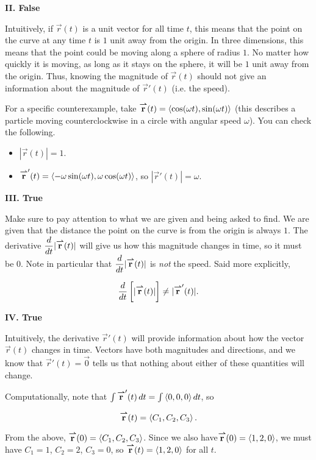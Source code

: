 \documentclass[noauthor]{ximera}
\begin{document}
\begin{problem}
\begin{freeResponse}
 \textbf{II. False} 
 
 \begin{explanation}
 Intuitively, if $\vec{r}(t)$ is a unit vector for all time $t$, this means that the point on the curve at any time $t$ is $1$ unit away from the origin.  In three dimensions, this means that the point could be moving along a sphere of radius $1$.  No matter how quickly it is moving, as long as it stays on the sphere, it will be $1$ unit away from the origin.  Thus, knowing the magnitude of $\vec{r}(t)$ should not give an information about the magnitude of $\vec{r}'(t)$ (i.e. the speed).
 
 For a specific counterexample, take ${\overset{\boldsymbol{\rightharpoonup}}{\mathbf{r}}}(t) = \left\langle \cos(\omega t),\sin(\omega t)\right\rangle$ (this describes a particle moving counterclockwise in a circle with angular speed $\omega$).  You can check the following.
 
 \begin{itemize}
 \item $|\vec{r}(t)| = 1$.
 \item ${\overset{\boldsymbol{\rightharpoonup}}{\mathbf{r}}}'(t) = \left\langle -\omega \sin(\omega t), \omega \cos(\omega t)\right\rangle$, so $|\vec{r}'(t)| = \omega$.
 \end{itemize}
 \end{explanation}

 
 \textbf{III. True}

\begin{explanation}
Make sure to pay attention to what we are given and being asked to find.  We are given that the distance the point on the curve is from the origin is always $1$.  The derivative $\dfrac{\mathop{}\!d}{\mathop{}\!d t} |{\overset{\boldsymbol{\rightharpoonup}}{\mathbf{r}}}(t) |$ will give us how this magnitude changes in time, so it must be $0$.  Note in particular that $\dfrac{\mathop{}\!d}{\mathop{}\!d t} |{\overset{\boldsymbol{\rightharpoonup}}{\mathbf{r}}}(t) |$ is \emph{not} the speed.  Said more explicitly,

\[
\frac{\mathop{}\!d}{\mathop{}\!d t} \left[\vphantom{\bigg|} |{\overset{\boldsymbol{\rightharpoonup}}{\mathbf{r}}}(t)| \right] \neq |{\overset{\boldsymbol{\rightharpoonup}}{\mathbf{r}}}'(t)|.
\]
\end{explanation}

\textbf{IV. True}

\begin{explanation}
Intuitively, the derivative $\vec{r}'(t)$ will provide information about how the vector $\vec{r}(t)$ changes in time.  Vectors have both magnitudes and directions, and we know that $\vec{r}'(t)=\vec{0}$ tells us that nothing about either of these quantities will change.

Computationally, note that $\int {\overset{\boldsymbol{\rightharpoonup}}{\mathbf{r}}}'(t) \mathop{}\!d t = \int \left\langle 0,0,0\right\rangle \mathop{}\!d t$, so

\[
{\overset{\boldsymbol{\rightharpoonup}}{\mathbf{r}}}(t) = \left\langle C_1,C_2,C_3\right\rangle.
\]

From the above, ${\overset{\boldsymbol{\rightharpoonup}}{\mathbf{r}}}(0) = \left\langle C_1,C_2,C_3\right\rangle$. Since we also have${\overset{\boldsymbol{\rightharpoonup}}{\mathbf{r}}}(0) = \left\langle 1,2,0\right\rangle$, we must have $C_1=1$, $C_2=2$, $C_3=0$, so ${\overset{\boldsymbol{\rightharpoonup}}{\mathbf{r}}}(t) = \left\langle 1,2,0\right\rangle$ for all $t$.
\end{explanation}

\end{freeResponse}
 
\end{problem}
\end{document}
